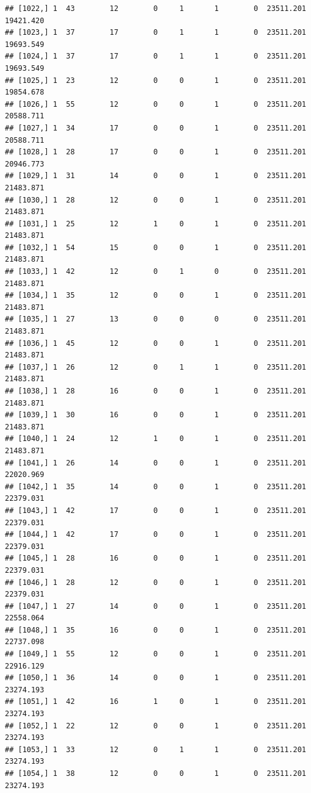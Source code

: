 \documentclass[
]{article}
\begin{document}
\begin{verbatim}
## [1022,] 1  43        12        0     1       1        0  23511.201  19421.420
## [1023,] 1  37        17        0     1       1        0  23511.201  19693.549
## [1024,] 1  37        17        0     1       1        0  23511.201  19693.549
## [1025,] 1  23        12        0     0       1        0  23511.201  19854.678
## [1026,] 1  55        12        0     0       1        0  23511.201  20588.711
## [1027,] 1  34        17        0     0       1        0  23511.201  20588.711
## [1028,] 1  28        17        0     0       1        0  23511.201  20946.773
## [1029,] 1  31        14        0     0       1        0  23511.201  21483.871
## [1030,] 1  28        12        0     0       1        0  23511.201  21483.871
## [1031,] 1  25        12        1     0       1        0  23511.201  21483.871
## [1032,] 1  54        15        0     0       1        0  23511.201  21483.871
## [1033,] 1  42        12        0     1       0        0  23511.201  21483.871
## [1034,] 1  35        12        0     0       1        0  23511.201  21483.871
## [1035,] 1  27        13        0     0       0        0  23511.201  21483.871
## [1036,] 1  45        12        0     0       1        0  23511.201  21483.871
## [1037,] 1  26        12        0     1       1        0  23511.201  21483.871
## [1038,] 1  28        16        0     0       1        0  23511.201  21483.871
## [1039,] 1  30        16        0     0       1        0  23511.201  21483.871
## [1040,] 1  24        12        1     0       1        0  23511.201  21483.871
## [1041,] 1  26        14        0     0       1        0  23511.201  22020.969
## [1042,] 1  35        14        0     0       1        0  23511.201  22379.031
## [1043,] 1  42        17        0     0       1        0  23511.201  22379.031
## [1044,] 1  42        17        0     0       1        0  23511.201  22379.031
## [1045,] 1  28        16        0     0       1        0  23511.201  22379.031
## [1046,] 1  28        12        0     0       1        0  23511.201  22379.031
## [1047,] 1  27        14        0     0       1        0  23511.201  22558.064
## [1048,] 1  35        16        0     0       1        0  23511.201  22737.098
## [1049,] 1  55        12        0     0       1        0  23511.201  22916.129
## [1050,] 1  36        14        0     0       1        0  23511.201  23274.193
## [1051,] 1  42        16        1     0       1        0  23511.201  23274.193
## [1052,] 1  22        12        0     0       1        0  23511.201  23274.193
## [1053,] 1  33        12        0     1       1        0  23511.201  23274.193
## [1054,] 1  38        12        0     0       1        0  23511.201  23274.193

\end{verbatim}
\end{document}
